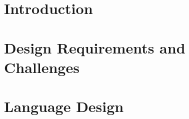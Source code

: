 \begin{abstract}

\end{abstract}

\maketitle

\section{Introduction}
\label{sec:intro}



\section{Design Requirements and Challenges}
\label{sec:background+challenge}




\newcommand{\denotes}[1]{{\llbracket {#1} \rrbracket}}
\newcommand{\denotesS}[1]{{{\llbracket {#1} \rrbracket}_S}}
\newcommand{\goodCtx}[2]{{ {#1} \ \vdash }}
\newcommand{\goodType}[3]{{ {#1} \vdash {#2} }}
\newcommand{\goodTerm}[3]{{ {#1} \vdash {#2} : {#3} }}
\newcommand{\goodSub}[3]{{ {#1} \vdash {#2} : {#3} }}
\newcommand{\goodSig}[3]{{ {#1} \vdash {#2} \ \  Sig^{#3} }}
\newcommand{\goodWSig}[3]{{ {#1} \vdash {#2} \ \ WSig^{#3} }}
\newcommand{\goodSeal}[4]{{ {#1} \vdash {#2} : {#3} \  |\  {#4} }}
\newcommand{\goodInh}[4]{{ {#1} \vdash {#2} : {#3} \twoheadrightarrow {#4}}}
\newcommand{\nat}{\mathbf{N}}

\newcommand{\cU}{{\mathcal{U}}}
\newcommand{\cB}{{\mathbb{B}}}
\newcommand{\cL}{{\mathcal{L}}}
\newcommand{\cC}{{\mathcal{C}}}
\newcommand{\cCt}{{\mathcal{C}_t}}
\newcommand{\bW}{{\mathbb{W}}}

\section{Language Design}
\label{sec:lang-design}


